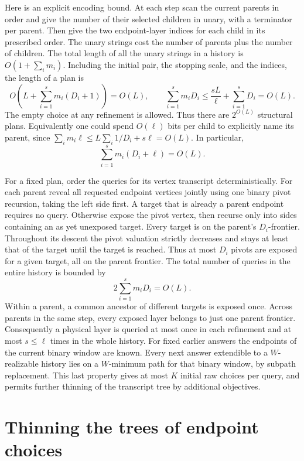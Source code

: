 \documentclass[11pt]{article}
\begin{document}
Here is an explicit encoding bound. At each step scan the current parents
in order and give the number of their selected children in unary, with a
terminator per parent. Then give the two endpoint-layer indices for each
child in its prescribed order. The unary strings cost the number of
parents plus the number of children. The total length of all the unary
strings in a history is $O(1+\sum_i m_i)$. Including the initial pair,
the stopping scale, and the indices, the length of a plan is
\[
 O\left(L+\sum_{i=1}^s m_i(D_i+1)\right)=O(L),
 \qquad
 \sum_{i=1}^s m_iD_i\le\frac{sL}{\ell}+\sum_{i=1}^sD_i=O(L).
\]
The empty choice at any refinement is allowed. Thus there are $2^{O(L)}$
structural plans. Equivalently one could spend $O(\ell)$ bits per child
to explicitly name its parent, since
$\sum_i m_i\ell\le L\sum_i 1/D_i+s\ell=O(L)$. In particular,
\begin{equation}\label{eq:pilot-budget}
                    \sum_{i=1}^s m_i(D_i+\ell)=O(L).
\end{equation}

For a fixed plan, order the queries for its vertex transcript
deterministically. For each parent reveal all requested endpoint vertices
jointly using one binary pivot recursion, taking the left side first.
A target that is already a parent endpoint requires no query.
Otherwise expose the pivot vertex, then recurse only into sides
containing an as yet unexposed target. Every target is on the parent's
$D_i$-frontier. Throughout its descent the pivot valuation strictly
decreases and stays at least that of the target until the target is
reached. Thus at most $D_i$ pivots are exposed for a given target,
all on the parent frontier. The total number of queries in the entire
history is bounded by
\[
                         2\sum_{i=1}^s m_iD_i=O(L).
\]
Within a parent, a common ancestor of different targets is exposed once.
Across parents in the same step, every exposed layer belongs to just one
parent frontier. Consequently a physical layer is queried at most once
in each refinement and at most $s\le\ell$ times in the whole history.
For fixed earlier answers the endpoints of the current binary window are
known. Every next answer extendible to a $W$-realizable history lies on
a $W$-minimum path for that binary window, by subpath replacement.
This last property gives at most $K$ initial raw choices per query, and
permits further thinning of the transcript tree by additional objectives.

\section{Thinning the trees of endpoint choices}
\end{document}
